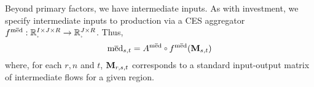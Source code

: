 \documentclass[12pt,a4paper,twoside, draft]{article}
\begin{document}
Beyond primary factors, we have intermediate inputs.
As with investment, we specify intermediate inputs to production via a CES
aggregator $f^{\med}: \nnreal^{I \times J \times R} \rightarrow
\nnreal^{J \times R}$.
Thus,
\begin{equation}\label{eq-ces-int}
  \med_{\node, t} = A^{\med}
    \ccirc f^{\med}(
      \mathbf{M}_{\node, t}
      )
\end{equation}
where, for each $r, n$ and $t$, $\textbf{M}_{r, {s}, t}$
corresponds to a standard input-output matrix of intermediate flows for a given
region.
\end{document}
